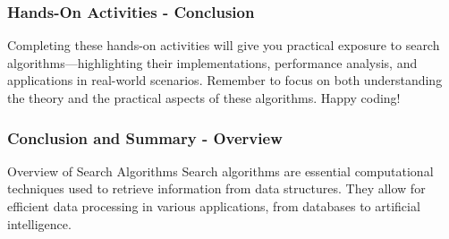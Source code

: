 \documentclass[aspectratio=169]{beamer}
\begin{document}
\begin{frame}[fragile]
    \frametitle{Hands-On Activities - Conclusion}
    Completing these hands-on activities will give you practical exposure to search algorithms—highlighting their implementations, performance analysis, and applications in real-world scenarios. Remember to focus on both understanding the theory and the practical aspects of these algorithms. Happy coding!
\end{frame}

\begin{frame}[fragile]
    \frametitle{Conclusion and Summary - Overview}
    \begin{block}{Overview of Search Algorithms}
        Search algorithms are essential computational techniques used to retrieve information from data structures. They allow for efficient data processing in various applications, from databases to artificial intelligence.
    \end{block}
\end{frame}
\end{document}
